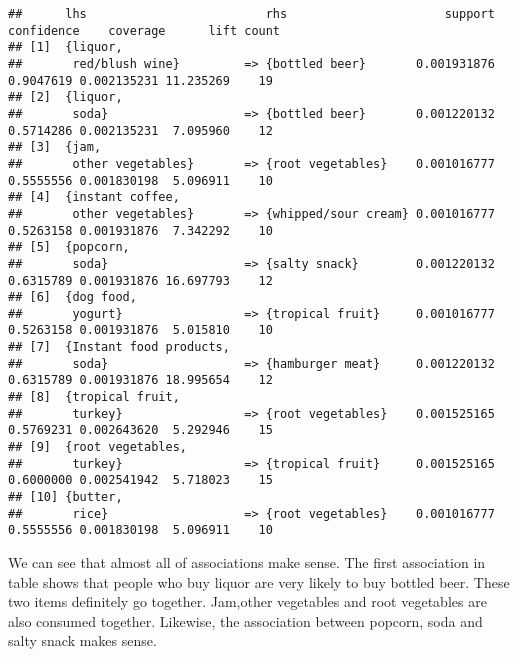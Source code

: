 \documentclass[
  12pt,
]{article}
\begin{document}
\begin{verbatim}
##      lhs                         rhs                      support confidence    coverage      lift count
## [1]  {liquor,                                                                                           
##       red/blush wine}         => {bottled beer}       0.001931876  0.9047619 0.002135231 11.235269    19
## [2]  {liquor,                                                                                           
##       soda}                   => {bottled beer}       0.001220132  0.5714286 0.002135231  7.095960    12
## [3]  {jam,                                                                                              
##       other vegetables}       => {root vegetables}    0.001016777  0.5555556 0.001830198  5.096911    10
## [4]  {instant coffee,                                                                                   
##       other vegetables}       => {whipped/sour cream} 0.001016777  0.5263158 0.001931876  7.342292    10
## [5]  {popcorn,                                                                                          
##       soda}                   => {salty snack}        0.001220132  0.6315789 0.001931876 16.697793    12
## [6]  {dog food,                                                                                         
##       yogurt}                 => {tropical fruit}     0.001016777  0.5263158 0.001931876  5.015810    10
## [7]  {Instant food products,                                                                            
##       soda}                   => {hamburger meat}     0.001220132  0.6315789 0.001931876 18.995654    12
## [8]  {tropical fruit,                                                                                   
##       turkey}                 => {root vegetables}    0.001525165  0.5769231 0.002643620  5.292946    15
## [9]  {root vegetables,                                                                                  
##       turkey}                 => {tropical fruit}     0.001525165  0.6000000 0.002541942  5.718023    15
## [10] {butter,                                                                                           
##       rice}                   => {root vegetables}    0.001016777  0.5555556 0.001830198  5.096911    10
\end{verbatim}

We can see that almost all of associations make sense. The first
association in table shows that people who buy liquor are very likely to
buy bottled beer. These two items definitely go together. Jam,other
vegetables and root vegetables are also consumed together. Likewise, the
association between popcorn, soda and salty snack makes sense.
\end{document}
